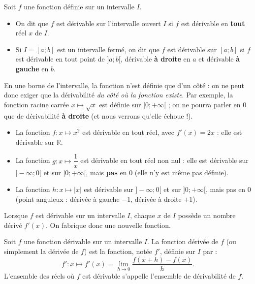 \documentclass[11pt]{article}
\newcommand{\cle}[1]{{\popxbold\color{popdark}#1}}
\newcounter{popsec}
\newcounter{popsub}
\newcommand{\courssub}[1]{%
  \stepcounter{popsub}%
  \par\vspace{9pt}\noindent{\popxbold\fontsize{11.5}{13}\selectfont\color{popink}{\color{poporange}\thepopsec.\thepopsub}\hspace{6pt}#1}\par\nopagebreak\vspace{4pt}
}
\begin{document}
\begin{definition}
Soit $f$ une fonction définie sur un intervalle $I$.
\begin{itemize}
\item On dit que $f$ est \cle{dérivable sur l'intervalle ouvert} $I$ si $f$ est dérivable en \textbf{tout} réel $x$ de $I$.
\item Si $I = [a ; b]$ est un intervalle fermé, on dit que $f$ est dérivable sur $[a ; b]$ si $f$ est dérivable en tout point de $]a ; b[$, dérivable \textbf{à droite} en $a$ et dérivable \textbf{à gauche} en $b$.
\end{itemize}
\end{definition}

\begin{attention}
En une borne de l'intervalle, la fonction n'est définie que d'un côté : on ne peut donc exiger que la dérivabilité \emph{du côté où la fonction existe}. Par exemple, la fonction racine carrée $x \mapsto \sqrt{x}$ est définie sur $[0 ; +\infty[$ ; on ne pourra parler en $0$ que de dérivabilité \textbf{à droite} (et nous verrons qu'elle échoue !).
\end{attention}

\begin{exemplebox}
\begin{itemize}
\item La fonction $f : x \mapsto x^2$ est dérivable en tout réel, avec $f'(x) = 2x$ : elle est dérivable sur $\mathbb{R}$.
\item La fonction $g : x \mapsto \dfrac{1}{x}$ est dérivable en tout réel non nul : elle est dérivable sur $]-\infty ; 0[$ et sur $]0 ; +\infty[$, mais \textbf{pas} en $0$ (elle n'y est même pas définie).
\item La fonction $h : x \mapsto |x|$ est dérivable sur $]-\infty ; 0[$ et sur $]0 ; +\infty[$, mais pas en $0$ (point anguleux : dérivée à gauche $-1$, dérivée à droite $+1$).
\end{itemize}
\end{exemplebox}

\courssub{La fonction dérivée $f'$}

Lorsque $f$ est dérivable sur un intervalle $I$, chaque $x$ de $I$ possède un nombre dérivé $f'(x)$. On fabrique donc une nouvelle fonction.

\begin{definition}
Soit $f$ une fonction dérivable sur un intervalle $I$. La \cle{fonction dérivée} de $f$ (ou simplement la \cle{dérivée} de $f$) est la fonction, notée $f'$, définie sur $I$ par :
\[ f' : x \longmapsto f'(x) = \lim_{h \to 0} \frac{f(x+h)-f(x)}{h}. \]
L'ensemble des réels où $f$ est dérivable s'appelle l'\cle{ensemble de dérivabilité} de $f$.
\end{definition}
\end{document}
